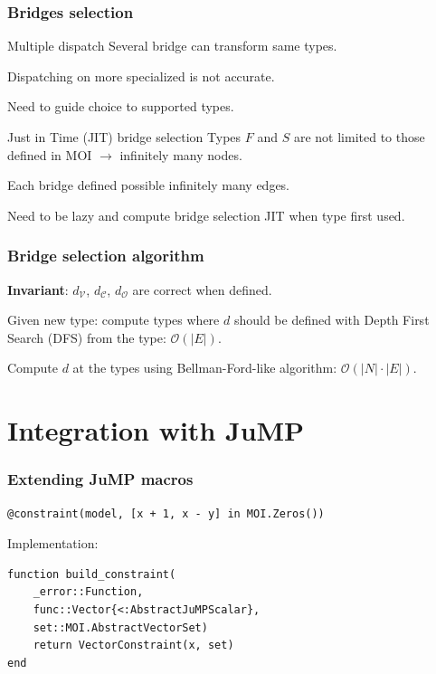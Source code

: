 \documentclass{beamer}
\begin{document}
\begin{frame}
  \frametitle{Bridges selection}

  \begin{block}{Multiple dispatch}
    Several bridge can transform same types.

    Dispatching on more specialized is not accurate.

    Need to guide choice to supported types.
  \end{block}

  \begin{block}{Just in Time (JIT) bridge selection}
    Types $F$ and $S$ are \alert{not limited} to those defined in MOI $\to$
    \alert{infinitely} many nodes.

    Each bridge defined possible \alert{infinitely} many edges.

    Need to be \alert{lazy} and compute bridge selection JIT when
    type first used.
  \end{block}

\end{frame}

\begin{frame}
  \frametitle{Bridge selection algorithm}
  \textbf{Invariant}: $d_\mathcal{V}$, $d_\mathcal{C}$, $d_\mathcal{O}$
  are correct when defined.

  Given new type: compute types where $d$ should be defined with
  Depth First Search (DFS) from the type: $\mathcal{O}(|E|)$.

  Compute $d$ at the types using Bellman-Ford-like algorithm: $\mathcal{O}(|N| \cdot |E|)$.
\end{frame}

\section{Integration with JuMP}

\begin{frame}[fragile]
  \frametitle{Extending JuMP macros}
\begin{verbatim}
@constraint(model, [x + 1, x - y] in MOI.Zeros())
\end{verbatim}
  Implementation:
\begin{verbatim}
function build_constraint(
    _error::Function,
    func::Vector{<:AbstractJuMPScalar},
    set::MOI.AbstractVectorSet)
    return VectorConstraint(x, set)
end
\end{verbatim}
\end{frame}
\end{document}
